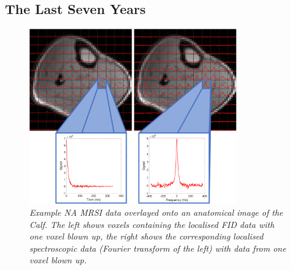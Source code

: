 \subsection{The Last Seven Years}

\begin{figure}[H]
    \centering
    \includegraphics[width=0.8\textwidth]{Figures/Intro/CSI.png}
    \caption{\textit{Example \ac{NA} \ac{MRSI} data overlayed onto an anatomical image of the Calf. The left shows voxels containing the localised FID data with one voxel blown up, the right shows the corresponding localised spectroscopic data (Fourier transform of the left) with data from one voxel blown up.}}
    \label{fig:intro:CSI}
\end{figure}

